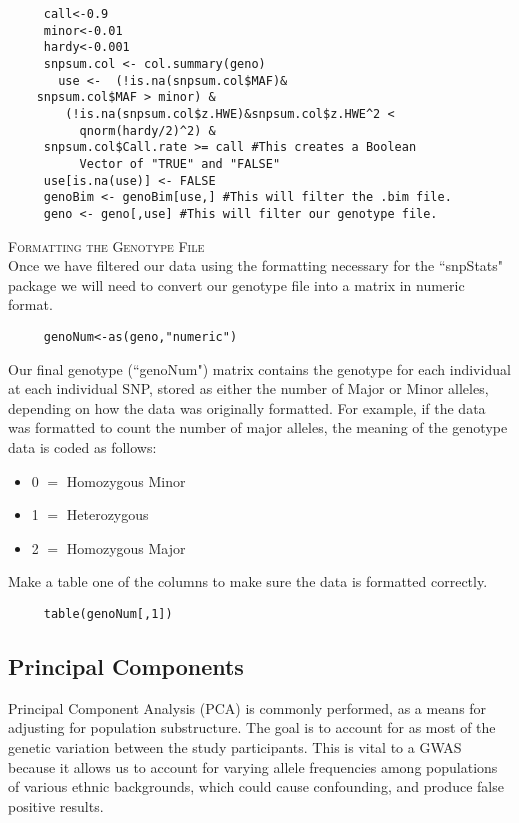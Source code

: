 \documentclass{ar2e}
\begin{document}
\begin{samepage}
\begin{verbatim}
     call<-0.9
     minor<-0.01
     hardy<-0.001
     snpsum.col <- col.summary(geno)
       use <-  (!is.na(snpsum.col$MAF)&
	snpsum.col$MAF > minor) & 
        (!is.na(snpsum.col$z.HWE)&snpsum.col$z.HWE^2 < 
          qnorm(hardy/2)^2) & 
     snpsum.col$Call.rate >= call #This creates a Boolean
          Vector of "TRUE" and "FALSE"
     use[is.na(use)] <- FALSE 
     genoBim <- genoBim[use,] #This will filter the .bim file.
     geno <- geno[,use] #This will filter our genotype file.
\end{verbatim}
\end{samepage}


\textsc{Formatting the Genotype File}\\
Once we have filtered our data using the formatting necessary for the ``snpStats" package we will need to convert our genotype file into a matrix in numeric format.
\begin{verbatim}
     genoNum<-as(geno,"numeric")
\end{verbatim}
Our final genotype (``genoNum") matrix contains the genotype for each individual at each individual SNP, stored as either the number of Major or Minor alleles, depending on how the data was originally formatted.  For example, if the data was formatted to count the number of major alleles, the meaning of the genotype data is coded as follows:

\begin{samepage}
\begin{itemize}
  \item 0 $=$ Homozygous Minor
  \item 1 $=$ Heterozygous
  \item 2 $=$ Homozygous Major
\end{itemize}
\end{samepage}

Make a table one of the columns to make sure the data is formatted correctly.
\begin{verbatim}
     table(genoNum[,1])
\end{verbatim}
\subsection{Principal Components}
Principal Component Analysis (PCA) is commonly performed, as a means for adjusting for population substructure.  The goal is to account for as most of the genetic variation between the study participants.  This is vital to a GWAS because it allows us to account for varying allele frequencies among populations of various ethnic backgrounds, which could cause confounding, and produce false positive results.
\end{document}
